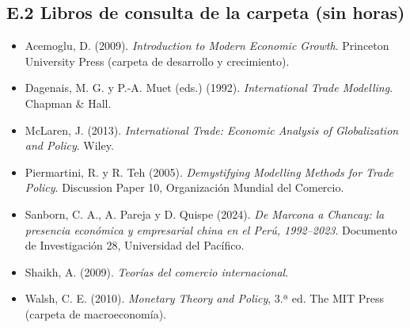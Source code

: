 \documentclass[11pt,a4paper]{article}
\begin{document}
\subsection*{E.2 Libros de consulta de la carpeta (sin horas)}
{\small
\begin{itemize}[leftmargin=1.4em,itemsep=1pt,label={}]
\item Acemoglu, D. (2009). \emph{Introduction to Modern Economic Growth}. Princeton University Press (carpeta de desarrollo y crecimiento).
\item Dagenais, M. G. y P.-A. Muet (eds.) (1992). \emph{International Trade Modelling}. Chapman \& Hall.
\item McLaren, J. (2013). \emph{International Trade: Economic Analysis of Globalization and Policy}. Wiley.
\item Piermartini, R. y R. Teh (2005). \emph{Demystifying Modelling Methods for Trade Policy}. Discussion Paper 10, Organización Mundial del Comercio.
\item Sanborn, C. A., A. Pareja y D. Quispe (2024). \emph{De Marcona a Chancay: la presencia económica y empresarial china en el Perú, 1992--2023}. Documento de Investigación 28, Universidad del Pacífico.
\item Shaikh, A. (2009). \emph{Teorías del comercio internacional}.
\item Walsh, C. E. (2010). \emph{Monetary Theory and Policy}, 3.ª ed. The MIT Press (carpeta de macroeconomía).
\end{itemize}
}
\end{document}
